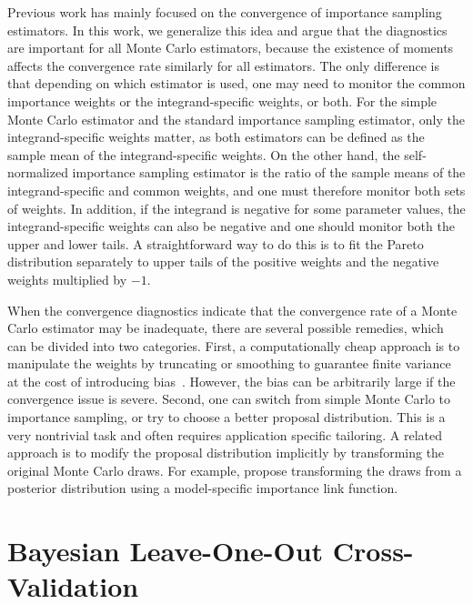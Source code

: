 \documentclass[12pt]{article}
\begin{document}
Previous work has mainly focused on the convergence of importance sampling estimators.
In this work, we generalize this idea and argue that
the diagnostics are important for all Monte Carlo estimators, because
the existence of moments affects the convergence rate similarly
for all estimators.
The only difference is that
depending on which estimator is used, one may need to monitor
the common importance weights or the integrand-specific weights, or both.
For the simple Monte Carlo estimator and the standard importance sampling estimator,
only the integrand-specific weights matter, as both estimators
can be defined as the sample mean of the integrand-specific weights.
On the other hand, the self-normalized importance sampling estimator is the ratio of the sample means
of the integrand-specific and common weights, and
one must therefore monitor both sets of weights.
In addition, if the integrand is negative for some parameter values, the integrand-specific weights can also
be negative and one should monitor both the upper and lower tails. A straightforward way to do this is to
fit the Pareto distribution
separately to upper tails of the positive weights and the negative weights multiplied by $-1$.





When the convergence diagnostics indicate that the convergence rate of a Monte Carlo estimator may be inadequate,
there are several possible remedies, which
can be divided into two categories.
First, a computationally cheap approach is to manipulate the weights by truncating or smoothing
to guarantee finite variance at the cost of introducing bias~\citep{ionides2008truncated,vehtari2015pareto}.
However, the bias can be arbitrarily large if the convergence issue is severe.
Second, one can switch from simple Monte Carlo to importance sampling,
or try to choose a better proposal distribution.
This is a very nontrivial task and often requires application specific
tailoring.
A related approach is to modify the proposal distribution
implicitly by transforming the original Monte Carlo draws.
For example, \citet{maceachern2000importance} propose transforming
the draws from a posterior distribution using a model-specific importance link function.









\section{Bayesian Leave-One-Out Cross-Validation}
\end{document}
